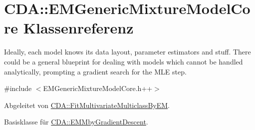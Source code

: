 \hypertarget{classCDA_1_1EMGenericMixtureModelCore}{
\section{CDA::EMGenericMixtureModelCore Klassenreferenz}
\label{classCDA_1_1EMGenericMixtureModelCore}
}


Ideally, each model knows its data layout, parameter estimators and stuff. There could be a general blueprint for dealing with models which cannot be handled analytically, prompting a gradient search for the MLE step.  




{\ttfamily \#include $<$EMGenericMixtureModelCore.h++$>$}



Abgeleitet von \hyperlink{classCDA_1_1FitMultivariateMulticlassByEM}{CDA::FitMultivariateMulticlassByEM}.



Basisklasse für \hyperlink{classCDA_1_1EMMbyGradientDescent}{CDA::EMMbyGradientDescent}.



